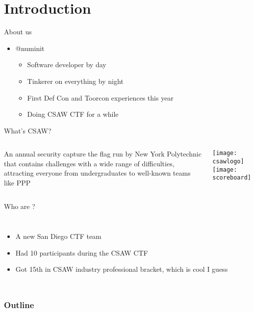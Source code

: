 
\section{Introduction}

\begin{frame}{About us}
    \begin{itemize}
        \item @numinit
        \begin{itemize}
            \item Software developer by day
            \item Tinkerer on everything by night
            \item First Def Con and Toorcon experiences this year
            \item Doing CSAW CTF for a while
        \end{itemize}
    \end{itemize}
\end{frame}

\begin{frame}{What's CSAW?}
    \begin{columns}
        An annual security capture the flag run by New York Polytechnic that
        contains challenges with a \alert{wide range of difficulties},
        attracting everyone from undergraduates to well-known teams like PPP

        \texttt{[image: csawlogo]} \\
        \texttt{[image: scoreboard]}
    \end{columns}
\end{frame}

\begin{frame}{Who are \VaporSec?}
    \begin{columns}
        \begin{itemize}
            \item A new \Aesthetic San Diego CTF team
            \item Had 10 participants during the CSAW CTF
            \item Got 15th in CSAW industry professional bracket, which is
                  cool I guess
        \end{itemize}

    \end{columns}
\end{frame}

\begin{frame}
    \frametitle{Outline}
    \tableofcontents[]
\end{frame}
